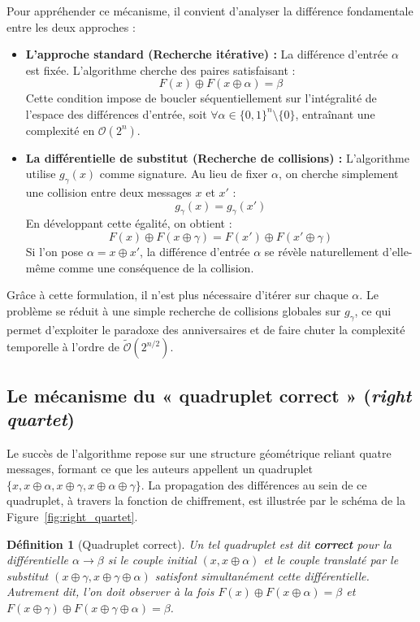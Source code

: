 \documentclass[a4paper,11pt]{article}
\newtheorem{definition}{Définition}
\begin{document}
Pour appréhender ce mécanisme, il convient d'analyser la différence fondamentale entre les deux approches :

\begin{itemize}
    \item \textbf{L'approche standard (Recherche itérative) :} 
    La différence d'entrée $\alpha$ est fixée. L'algorithme cherche des paires satisfaisant :
    $$F(x) \oplus F(x \oplus \alpha) = \beta$$
    Cette condition impose de boucler séquentiellement sur l'intégralité de l'espace des différences d'entrée, soit $\forall \alpha \in \{0, 1\}^n \setminus \{0\}$, entraînant une complexité en $\mathcal{O}(2^n)$.

    \item \textbf{La différentielle de substitut (Recherche de collisions) :} 
    L'algorithme utilise $g_{\gamma}(x)$ comme signature. Au lieu de fixer $\alpha$, on cherche simplement une collision entre deux messages $x$ et $x'$ :
    $$g_{\gamma}(x) = g_{\gamma}(x')$$
    En développant cette égalité, on obtient :
    $$F(x) \oplus F(x \oplus \gamma) = F(x') \oplus F(x' \oplus \gamma)$$
    Si l'on pose $\alpha = x \oplus x'$, la différence d'entrée $\alpha$ se révèle naturellement d'elle-même comme une conséquence de la collision.
\end{itemize}

Grâce à cette formulation, il n'est plus nécessaire d'itérer sur chaque $\alpha$. Le problème se réduit à une simple recherche de collisions globales sur $g_{\gamma}$, ce qui permet d'exploiter le paradoxe des anniversaires et de faire chuter la complexité temporelle à l'ordre de $\tilde{\mathcal{O}}(2^{n/2})$.

\subsection{Le mécanisme du « quadruplet correct » (\textit{right quartet})}

Le succès de l'algorithme repose sur une structure géométrique reliant quatre messages, formant ce que les auteurs appellent un quadruplet $\{x, x \oplus \alpha, x \oplus \gamma, x \oplus \alpha \oplus \gamma\}$. La propagation des différences au sein de ce quadruplet, à travers la fonction de chiffrement, est illustrée par le schéma de la Figure~\ref{fig:right_quartet}.

\begin{definition}[Quadruplet correct]
Un tel quadruplet est dit \textbf{correct} pour la différentielle $\alpha \rightarrow \beta$ si le couple initial $(x, x \oplus \alpha)$ et le couple translaté par le substitut $(x \oplus \gamma, x \oplus \gamma \oplus \alpha)$ satisfont simultanément cette différentielle. Autrement dit, l'on doit observer à la fois $F(x) \oplus F(x \oplus \alpha) = \beta$ et $F(x \oplus \gamma) \oplus F(x \oplus \gamma \oplus \alpha) = \beta$.
\end{definition}
\end{document}
